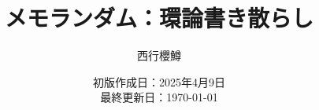\newcommand{\CATEGORY}{メモランダム}%
\newcommand{\TITLE}{環論書き散らし}
\newcommand{\AUTHORNAME}{西行櫻鱒}
\newcommand{\CREATEDAT}{2025年4月9日}

\title{\CATEGORY：\TITLE}
\author{\AUTHORNAME}
\date{初版作成日：\CREATEDAT\\最終更新日：\today\\}

